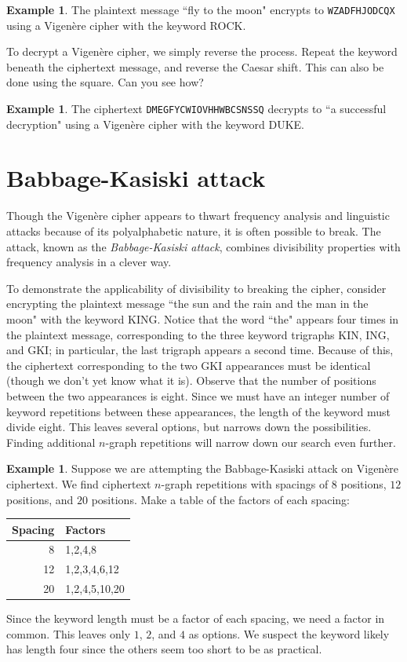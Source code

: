 \documentclass{book}
\theoremstyle{plain}
\theoremstyle{definition}
\newtheorem{example}[theorem]{Example}
\newcommand{\ciphertext}[1]{\texttt{#1}} %
\begin{document}
\begin{example}
The plaintext message ``fly to the moon" encrypts to \ciphertext{WZADFHJODCQX} using a Vigen\`{e}re cipher with the keyword ROCK.
\end{example}

To decrypt a Vigen\`{e}re cipher, we simply reverse the process. Repeat the keyword beneath the ciphertext message, and reverse the Caesar shift. This can also be done using the square. Can you see how?

\begin{example}
The ciphertext \ciphertext{DMEGFYCWIOVHHWBCSNSSQ} decrypts to ``a successful decryption" using a Vigen\`{e}re cipher with the keyword DUKE.
\end{example}

\section{Babbage-Kasiski attack}
Though the Vigen\`{e}re cipher appears to thwart frequency analysis and linguistic attacks because of its polyalphabetic nature, it is often possible to break. The attack, known as the {\it Babbage-Kasiski attack}, combines divisibility properties with frequency analysis in a clever way.

To demonstrate the applicability of divisibility to breaking the cipher, consider encrypting the plaintext message ``the sun and the rain and the man in the moon" with the keyword KING. Notice that the word ``the" appears four times in the plaintext message, corresponding to the three keyword trigraphs KIN, ING, and GKI; in particular, the last trigraph appears a second time. Because of this, the ciphertext corresponding to the two GKI appearances must be identical (though we don't yet know what it is). Observe that the number of positions between the two appearances is eight. Since we must have an integer number of keyword repetitions between these appearances, the length of the keyword must divide eight. This leaves several options, but narrows down the possibilities. Finding additional $n$-graph repetitions will narrow down our search even further.

\begin{example}
Suppose we are attempting the Babbage-Kasiski attack on Vigen\`{e}re ciphertext. We find ciphertext $n$-graph repetitions with spacings of $8$ positions, $12$ positions, and $20$ positions. Make a table of the factors of each spacing:

\begin{center}
\begin{tabular}{rl}
Spacing & Factors \\
\hline
8 & 1,2,4,8 \\
12 & 1,2,3,4,6,12 \\
20 & 1,2,4,5,10,20
\end{tabular}
\end{center}

Since the keyword length must be a factor of each spacing, we need a factor in common. This leaves only $1$, $2$, and $4$ as options. We suspect the keyword likely has length four since the others seem too short to be as practical.
\end{example}
\end{document}
